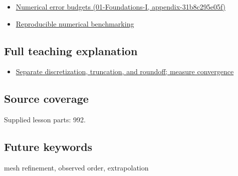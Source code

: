 \begin{itemize}
\tightlist
\item
  \href{}{Numerical error budgets (01-Foundations-I, appendix-31b8c295e05f)}
\item
  \hyperref[appendix-b9db93e28371]{Reproducible numerical benchmarking}
\end{itemize}

\subsection{Full teaching explanation}\label{full-teaching-explanation}

\begin{itemize}
\tightlist
\item
  \href{Continuous\%20Notes/Computing\%20Foundations\%20-\%20From\%20Bits\%20to\%20C++\%20and\%20Systems\%20APIs\#Separate\%20discretization,\%20truncation,\%20and\%20roundoff;\%20measure\%20convergence}{Separate discretization, truncation, and roundoff; measure convergence}
\end{itemize}

\subsection{Source coverage}\label{source-coverage}

Supplied lesson parts: 992.

\subsection{Future keywords}\label{future-keywords}

mesh refinement, observed order, extrapolation
